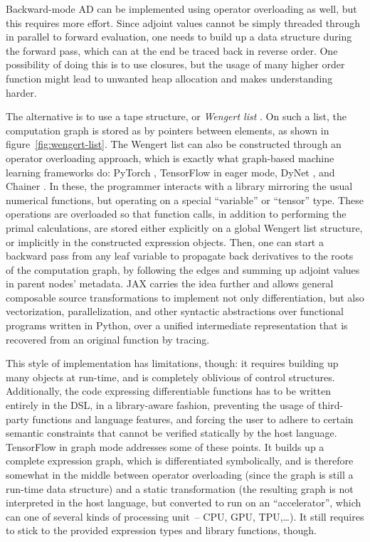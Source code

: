 Backward-mode AD can be implemented using operator overloading as well, but this requires more
effort.  Since adjoint values cannot be simply threaded through in parallel to forward evaluation,
one needs to build up a data structure during the forward pass, which can at the end be traced back
in reverse order.  One possibility of doing this is to use closures, but the usage of many higher
order function might lead to unwanted heap allocation and makes understanding harder.

The alternative is to use a tape structure, or \emph{Wengert list} \parencite[][section
3]{baydin2018automatic}.  On such a list, the computation graph is stored as by pointers between
elements, as shown in figure~\ref{fig:wengert-list}.  The Wengert list can also be constructed
through an operator overloading approach, which is exactly what graph-based machine learning
frameworks do: PyTorch \parencite{paszke2017automatic}, TensorFlow \parencite{abadi2015tensorflow}
in eager mode, DyNet \parencite{neubig2017dynet}, and Chainer \parencite{tokui2015chainer}.  In
these, the programmer interacts with a library mirroring the usual numerical functions, but
operating on a special \enquote{variable} or \enquote{tensor} type.  These operations are overloaded
so that function calls, in addition to performing the primal calculations, are stored either
explicitly on a global Wengert list structure, or implicitly in the constructed expression objects.
Then, one can start a backward pass from any leaf variable to propagate back derivatives to the
roots of the computation graph, by following the edges and summing up adjoint values in parent
nodes' metadata.  JAX \parencite{bradbury2018jax} carries the idea further and allows general
composable source transformations to implement not only differentiation, but also vectorization,
parallelization, and other syntactic abstractions over functional programs written in Python, over a
unified intermediate representation that is recovered from an original function by tracing.

This style of implementation has limitations, though: it requires building up many objects at
run-time, and is completely oblivious of control structures.  Additionally, the code expressing
differentiable functions has to be written entirely in the DSL, in a library-aware fashion,
preventing the usage of third-party functions and language features, and forcing the user to adhere
to certain semantic constraints that cannot be verified statically by the host language.  TensorFlow
in graph mode addresses some of these points.  It builds up a complete expression graph, which is
differentiated symbolically, and is therefore somewhat in the middle between operator overloading
(since the graph is still a run-time data structure) and a static transformation (the resulting graph
is not interpreted in the host language, but converted to run on an \enquote{accelerator}, which can
one of several kinds of processing unit~-- CPU, GPU, TPU,\ldots).  It still requires to stick to the
provided expression types and library functions, though.

